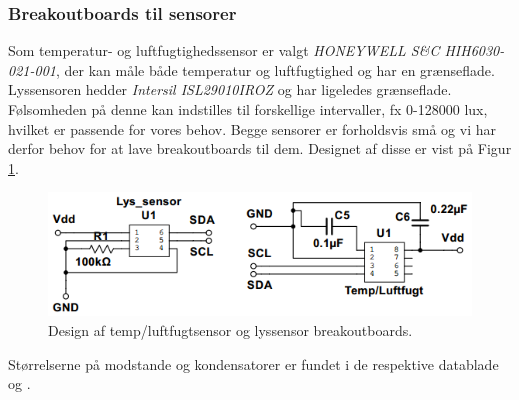 \subsubsection{Breakoutboards til \IIC sensorer}

Som temperatur- og luftfugtighedssensor er valgt \textit{HONEYWELL S\&C  HIH6030-021-001}, der kan måle både temperatur og luftfugtighed og har en \IIC grænseflade. Lyssensoren hedder \textit{Intersil ISL29010IROZ} og har ligeledes \IIC grænseflade. Følsomheden på denne kan indstilles til forskellige intervaller, fx 0-128000 lux, hvilket er passende for vores behov. Begge sensorer er forholdsvis små og vi har derfor behov for at lave breakoutboards til dem. Designet af disse er vist på Figur \ref{fig:temp_luftfugt_design}.

\begin{figure}[h]
\centering
\includegraphics[width={\textwidth-6cm}, trim=0 0 0 0, clip=true]{../fig/TempOgLys.png}
\caption{Design af temp/luftfugtsensor og lyssensor breakoutboards.}
\label{fig:temp_luftfugt_design}
\end{figure}

Størrelserne på modstande og kondensatorer er fundet i de respektive datablade \cite{lib:TempHum_DS} og \cite{lib:LightSens}.